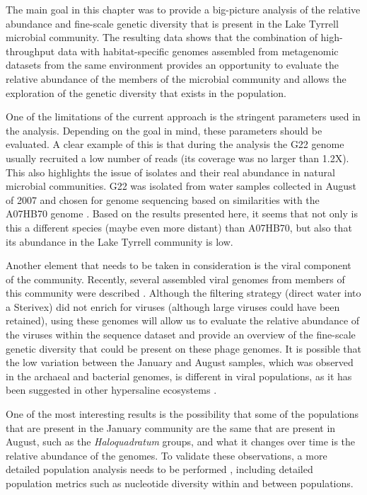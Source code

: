 The main goal in this chapter was to provide a big-picture analysis of the relative abundance and fine-scale genetic diversity that is present in the Lake Tyrrell microbial community. The resulting data shows that the combination of high-throughput data with habitat-specific genomes assembled from metagenomic datasets from the same environment \cite{Narasingarao:2012kp,Podell:2013kx,Podell:2013fp} provides an opportunity to evaluate the relative abundance of the members of the microbial community and allows the exploration of the genetic diversity that exists in the population.

One of the limitations of the current approach is the stringent parameters used in the analysis. Depending on the goal in mind, these parameters should be evaluated. A clear example of this is that during the analysis the G22 genome usually recruited a low number of reads (its coverage was no larger than 1.2X). This also highlights the issue of isolates and their real abundance in natural microbial communities. G22 was isolated from water samples collected in August of 2007 and chosen for genome sequencing based on similarities with the A07HB70 genome \cite{Ugalde:2013hb}. Based on the results presented here, it seems that not only  is this a different species (maybe even more distant) than A07HB70, but also that its abundance in the Lake Tyrrell community is low.

Another element that needs to be taken in consideration is the viral component of the community. Recently, several assembled viral genomes from members of this community were described \cite{Emerson:2012gh,Emerson:2013ck}. Although the filtering strategy (direct water into a Sterivex) did not enrich for viruses (although large viruses could have been retained), using these genomes will allow us to evaluate the relative abundance of the viruses within the sequence dataset and provide an overview of the fine-scale genetic diversity that could be present on these phage genomes. It is possible that the low variation between the January and August samples, which was observed in the archaeal and bacterial genomes, is different in viral populations, as it has been suggested in other hypersaline ecosystems \cite{RodriguezBrito:2010in}.

One of the most interesting results is the possibility that some of the populations that are present in the January community are the same that are present in August, such as the \textit{Haloquadratum} groups, and what it changes over time is the relative abundance of the genomes. To validate these observations, a more detailed population analysis needs to be performed \cite{Schloissnig:2012hx,Kryazhimskiy:2008hq,Whitaker:2006gf}, including detailed population metrics such as nucleotide diversity within and between populations.

